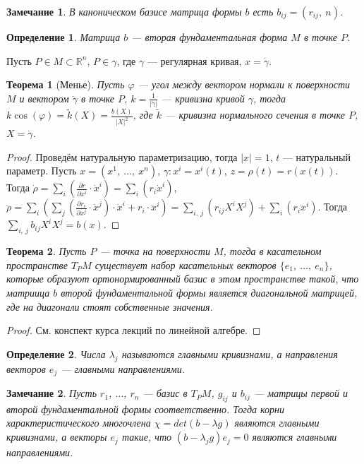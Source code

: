 \documentclass[12pt]{article}
\theoremstyle{plain}
\newtheorem{theorem}{Теорема}[section]
\newtheorem{definition}{Определение}[section]
\newtheorem{remark}{Замечание}
\newcommand{\R}{\mathbb R}
\renewcommand{\phi}{\varphi}
\begin{document}
    \begin{remark}
        В каноническом базисе матрица формы $b$ есть $b_{ij}=(r_{ij}, \ n)$.
    \end{remark}
    \begin{definition}
        Матрица $b$ --- вторая фундаментальная форма $M$ в точке $P$.
    \end{definition}
    Пусть $P\in M\subset\R^n$, $P\in\gamma$, где $\gamma$ --- регулярная кривая, $x=\dot{\gamma}$.
    \begin{theorem}[Менье]
        Пусть $\phi$ --- угол между вектором нормали к поверхности $M$ и вектором $\ddot{\gamma}$ в точке $P$, $k=\frac{1}{|\ddot{\gamma}|}$ --- кривизна кривой $\gamma$, тогда $k\cos(\phi)=\tilde{k}(X)=\frac{b(X)}{|X|^2}$, где $\tilde{k}$ --- кривизна нормального сечения в точке $P$, $X=\dot{\gamma}$.
    \end{theorem}
    \begin{proof}
        Проведём натуральную параметризацию, тогда $|x|=1$, $t$ --- натуральный параметр. Пусть $x=(x^1, \ \ldots, \ x^n)$, $\gamma : x^i=x^i(t)$, $z=\rho(t)=r(x(t))$.\\Тогда $\dot{\rho}=\sum\limits_i\left(\frac{\partial r}{\partial x^i}\cdot\dot{x}^i\right)=\sum\limits_i\left(r_i\dot{x}^i\right)$, $\ddot{\rho}=\sum\limits_i\left(\sum\limits_j\left(\frac{\partial r_i}{\partial x^j}\cdot\dot{x}^j\right)\cdot\dot{x}^i+r_i\cdot\ddot{x}^i\right)=\sum\limits_{i, \ j}\left(r_{ij}X^iX^j\right)+\sum\limits_i\left(r_i\ddot{x}^i\right)$. Тогда $\sum\limits_{i, \ j}b_{ij}X^iX^j=b(x)$.
    \end{proof}
    \begin{theorem}
        Пусть $P$ --- точка на поверхности $M$, тогда в касательном пространстве $T_PM$ существует набор касательных векторов $\{e_1, \ \ldots, \ e_n\}$, которые образуют ортонормированный базис в этом пространстве такой, что матриица $b$ второй фундаментальной формы является диагональной матрицей, где на диагонали стоят собственные значения.
    \end{theorem}
    \begin{proof}
        См. конспект курса лекций по линейной алгебре.
    \end{proof}
    \begin{definition}
        Числа $\lambda_j$ называются главными кривизнами, а направления векторов $e_j$ --- главными направлениями.
    \end{definition}
    \begin{remark}
        Пусть $r_1$, $\ldots$, $r_n$ --- базис в $T_PM$, $g_{ij}$ и $b_{ij}$ --- матрицы первой и второй фундаментальной формы соответственно. Тогда корни характеристического многочлена $\chi=det(b-\lambda g)$ являются главными кривизнами, а векторы $e_j$ такие, что $(b-\lambda_jg)e_j=0$ являются главными направлениями.
    \end{remark}
\end{document}
